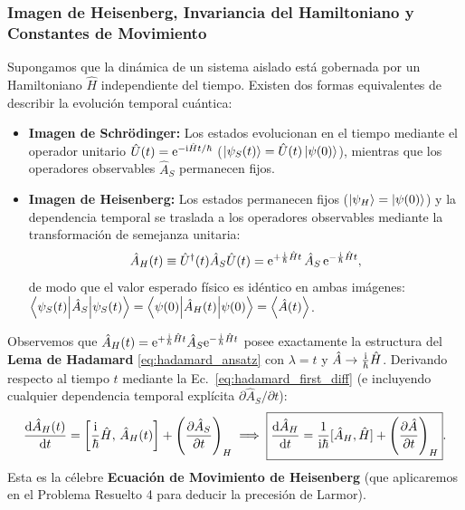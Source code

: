 \subsubsection{Imagen de Heisenberg, Invariancia del Hamiltoniano y Constantes de Movimiento}
Supongamos que la dinámica de un sistema aislado está gobernada por un Hamiltoniano $\hat{H}$ independiente del tiempo. Existen dos formas equivalentes de describir la evolución temporal cuántica:
\begin{itemize}
    \item \textbf{Imagen de Schrödinger:} Los estados evolucionan en el tiempo mediante el operador unitario $\hat{U}(t) = \mathrm{e}^{-\mathrm{i}\hat{H}t/\hbar}$ ($\left| \psi_S(t) \right\rangle = \hat{U}(t)\left| \psi(0) \right\rangle$), mientras que los operadores observables $\hat{A}_S$ permanecen fijos.
    \item \textbf{Imagen de Heisenberg:} Los estados permanecen fijos ($\left| \psi_H \right\rangle = \left| \psi(0) \right\rangle$) y la dependencia temporal se traslada a los operadores observables mediante la transformación de semejanza unitaria:
    \begin{equation}
        \hat{A}_H(t) \equiv \hat{U}^\dagger(t)\hat{A}_S\hat{U}(t) = \mathrm{e}^{+\frac{\mathrm{i}}{\hbar}\hat{H}t}\,\hat{A}_S\,\mathrm{e}^{-\frac{\mathrm{i}}{\hbar}\hat{H}t},
    \end{equation}
    de modo que el valor esperado físico es idéntico en ambas imágenes: $\left\langle \psi_S(t) \middle| \hat{A}_S \middle| \psi_S(t) \right\rangle = \left\langle \psi(0) \middle| \hat{A}_H(t) \middle| \psi(0) \right\rangle = \left\langle \hat{A}(t) \right\rangle$.
\end{itemize}
Observemos que $\hat{A}_H(t) = \mathrm{e}^{+\frac{\mathrm{i}}{\hbar}\hat{H}t}\hat{A}_S\mathrm{e}^{-\frac{\mathrm{i}}{\hbar}\hat{H}t}$ posee exactamente la estructura del \textbf{Lema de Hadamard} \eqref{eq:hadamard_ansatz} con $\lambda = t$ y $\hat{A} \to \frac{\mathrm{i}}{\hbar}\hat{H}$. Derivando respecto al tiempo $t$ mediante la Ec.~\eqref{eq:hadamard_first_diff} (e incluyendo cualquier dependencia temporal explícita $\partial\hat{A}_S/\partial t$):
\begin{equation}
    \frac{\mathrm{d}\hat{A}_H(t)}{\mathrm{d} t} = \left[\frac{\mathrm{i}}{\hbar}\hat{H}, \, \hat{A}_H(t)\right] + \left(\frac{\partial\hat{A}_S}{\partial t}\right)_H \implies \boxed{\frac{\mathrm{d}\hat{A}_H}{\mathrm{d} t} = \frac{1}{\mathrm{i}\hbar}[\hat{A}_H, \hat{H}] + \left(\frac{\partial\hat{A}}{\partial t}\right)_H}.
    \label{eq:heisenberg_eq_motion}
\end{equation}
Esta es la célebre \textbf{Ecuación de Movimiento de Heisenberg} (que aplicaremos en el Problema Resuelto 4 para deducir la precesión de Larmor).

